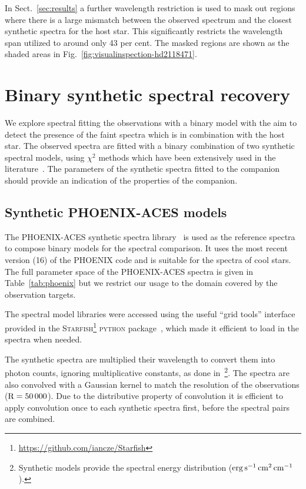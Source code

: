 \documentclass[fleqn,usenatbib]{mnras}
\begin{document}
In Sect.~\ref{sec:results} a further wavelength restriction is used to mask out regions where there is a large mismatch between the observed spectrum and the closest synthetic spectra for the host star. This significantly restricts the wavelength span utilized to around only 43 per cent. The masked regions are shown as the shaded areas in Fig.~\ref{fig:visualinspection-hd2118471}.


\section{Binary synthetic spectral recovery}
\label{subsec:companion_recovery}
We explore spectral fitting the observations with a binary model with the aim to detect the presence of the faint spectra which is in combination with the host star. The observed spectra are fitted with a binary combination of two synthetic spectral models, using \(\chi^{2}\) methods which have been extensively used in the literature~\citep[e.g.][]{astudillo-defru_harps_2015, passegger_fundamental_2016, zechmeister_spectrum_2018,nemravova_xtauri_2016}. {The parameters of the synthetic spectra fitted to the companion should provide an indication of the properties of the companion.}

\subsection{Synthetic PHOENIX-ACES models}
\label{subsec:spec_models}
The PHOENIX-ACES synthetic spectra library~\citep{husser_new_2013} is used as the reference spectra to compose binary models for the spectral comparison. It uses the most recent version (16) of the PHOENIX code and is suitable for the spectra of cool stars. The full parameter space of the PHOENIX-ACES spectra is given in Table~\ref{tab:phoenix} but we restrict our usage to the domain covered by the observation targets.



The spectral model libraries were accessed using the useful ``grid tools'' interface provided in the \textsc{Starfish}\footnote{\url{https://github.com/iancze/Starfish}} \textsc{python} package~\citep{czekala_constructing_2015}, which made it efficient to load in the spectra when needed.

The synthetic spectra are multiplied their wavelength to convert them into photon counts, ignoring multiplicative constants, as done in~\citet{figueira_radial_2016}\footnote{Synthetic models provide the spectral energy distribution (\(\rm erg\,s^{-1}\,cm^{2}\,cm^{-1}\)).}. The spectra are also convolved with a Gaussian kernel to match the resolution of the observations (\(\rm R=50\,000\)). Due to the distributive property of convolution it is efficient to apply convolution once to each synthetic spectra first, before the spectral pairs are combined.
\end{document}
